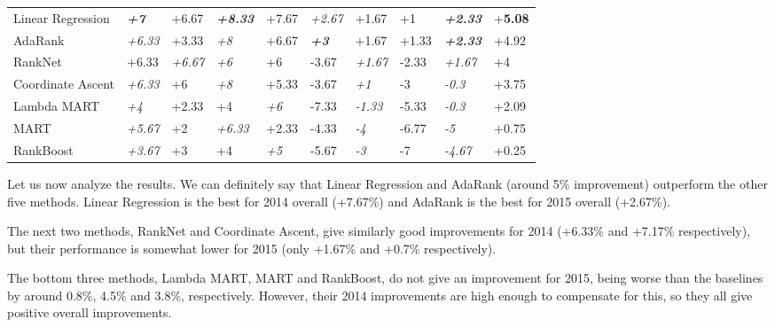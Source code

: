 \begin{table}[h!]
{\begin{tabular}{@{}llllllllll@{}}
Linear Regression & \textit{\textbf{+7}} & +6.67             & \textit{\textbf{+8.33}}   & +7.67              	& \textit{+2.67}       	& +1.67    		& +1          & \textit{\textbf{+2.33}}   & +\textbf{5.08}  \\
AdaRank           & \textit{+6.33}       & +3.33             & \textit{+8}               & +6.67              	& \textit{\textbf{+3}}	& +1.67         	& +1.33       & \textit{\textbf{+2.33}}   & +4.92  \\
RankNet           & +6.33             	 & \textit{+6.67}    & \textit{+6}               & +6                 	& -3.67       		& \textit{+1.67}        & -2.33       & \textit{+1.67}            & +4  \\
Coordinate Ascent & \textit{+6.33}       & +6                & \textit{+8}               & +5.33              	& -3.67      		& \textit{+1}           & -3          & \textit{-0.3}             & +3.75  \\
Lambda MART	  & \textit{+4}		 & +2.33	     & +4		         & \textit{+6}	   	& -7.33			& \textit{-1.33}	& -5.33	      & \textit{-0.3}		  & +2.09  \\
MART	 	  & \textit{+5.67}	 & +2		     & \textit{+6.33}	         & +2.33		& -4.33			& \textit{-4}		& -6.77	      & \textit{-5}		  & +0.75 \\
RankBoost	  & \textit{+3.67}	 & +3		     & +4		         & \textit{+5}		& -5.67			& \textit{-3}		& -7	      & \textit{-4.67}		  & +0.25 \\

\bottomrule
\end{tabular}%
}
\end{table}

Let us now analyze the results. We can definitely say that Linear Regression and AdaRank (around 5\% improvement)
outperform the other five methods. Linear Regression is the best for 2014 overall (+7.67\%) and
AdaRank is the best for 2015 overall (+2.67\%).

The next two methods, RankNet and Coordinate Ascent, give similarly good
improvements for 2014 (+6.33\% and +7.17\% respectively), but their performance is somewhat lower
for 2015 (only +1.67\% and +0.7\% respectively).

The bottom three methods, Lambda MART, MART and RankBoost, do not give an improvement for 2015, being worse
than the baselines by around 0.8\%, 4.5\% and 3.8\%, respectively. However, their 2014 improvements are high enough to compensate
for this, so they all give positive overall improvements.

